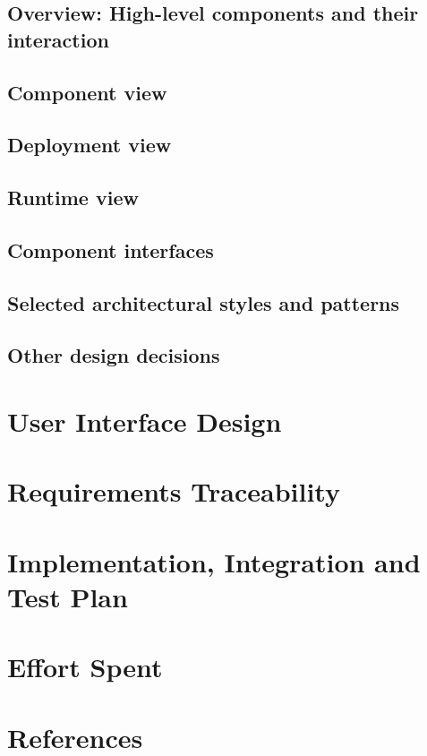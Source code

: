 \documentclass[a4paper]{article}
\begin{document}
\subsection{Overview: High-level components and their interaction}

\subsection{Component view}

\subsection{Deployment view}

\subsection{Runtime view}

\subsection{Component interfaces}

\subsection{Selected architectural styles and patterns}

\subsection{Other design decisions}

\section{User Interface Design}

\section{Requirements Traceability}

\section{Implementation, Integration and Test Plan}

\section{Effort Spent}

\section{References}
\end{document}
